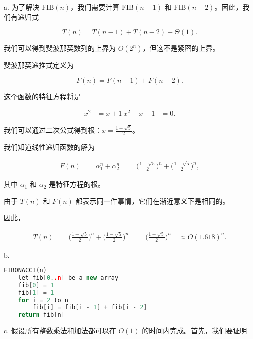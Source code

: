 \documentclass[a4paper, justified]{tufte-handout}
\begin{document}
\begin{solution}
  a. 为了解决 $\text{FIB}(n)$，我们需要计算 $\text{FIB}(n - 1)$ 和 $\text{FIB}(n - 2)$。因此，我们有递归式

  $$T(n) = T(n - 1) + T(n - 2) + \Theta(1).$$

  我们可以得到斐波那契数列的上界为 $O(2^n)$，但这不是紧密的上界。

  斐波那契递推式定义为

  $$F(n) = F(n - 1) + F(n - 2).$$

  这个函数的特征方程将是

  $$ \begin{aligned} x^2 & = x + 1 \ x^2 - x - 1 & = 0. \end{aligned} $$

  我们可以通过二次公式得到根：$x = \frac{1 \pm \sqrt 5}{2}$。

  我们知道线性递归函数的解为

  $$ \begin{aligned} F(n) & = \alpha_1^n + \alpha_2^n \ & = \bigg(\frac{1 + \sqrt 5}{2}\bigg)^n + \bigg(\frac{1 - \sqrt 5}{2}\bigg)^n, \end{aligned} $$

  其中 $\alpha_1$ 和 $\alpha_2$ 是特征方程的根。

  由于 $T(n)$ 和 $F(n)$ 都表示同一件事情，它们在渐近意义下是相同的。

  因此，

  $$ \begin{aligned} T(n) & = \bigg(\frac{1 + \sqrt 5}{2}\bigg)^n + \bigg(\frac{1 - \sqrt 5}{2}\bigg)^n \ & = \bigg(\frac{1 + \sqrt 5}{2}\bigg)^n \ & \approx O(1.618)^n. \end{aligned} $$


  b.
  \begin{lstlisting}[language=C++,style=style1]
    FIBONACCI(n)
    let fib[0..n] be a new array
    fib[0] = 1
    fib[1] = 1
    for i = 2 to n
        fib[i] = fib[i - 1] + fib[i - 2]
    return fib[n]
  \end{lstlisting}

  c. 假设所有整数乘法和加法都可以在 $O(1)$ 的时间内完成。首先，我们要证明


\end{solution}
\end{document}
